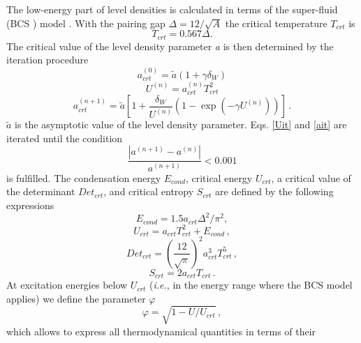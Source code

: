 The low-energy part of level densities is calculated in terms of the
super-fluid (BCS%
) model \cite{igna}. With the pairing gap $\Delta=12/%
\sqrt{A}$ the critical temperature $T_{crt}$ is 
\begin{equation}
T_{crt}=0.567\Delta.  \label{Tcrt}
\end{equation}
The critical value of the level density parameter \emph{a} is then
determined by the iteration procedure 
\begin{equation}
a_{crt}^{(0)}=\widetilde{a}\left(1+\gamma\delta_{W}\right)  \label{ait0}
\end{equation}
\begin{equation}
U^{(n)}=a_{crt}^{(n)}T_{crt}^{2}  \label{Uit}
\end{equation}
\begin{equation}
a_{crt}^{(n+1)}=\widetilde{a}\left[1+\frac{\delta_{W}}{U^{(n)}}%
\left(1-\exp\left(-\gamma U^{(n)}\right)\right)\right]\,.  \label{ait}
\end{equation}
$\widetilde{a}$ is the asymptotic value of the level density parameter. Eqs. %
\ref{Uit} and \ref{ait} are iterated until the condition 
\begin{equation}
\frac{\left|a^{(n+1)}-a^{(n)}\right|}{a^{(n+1)}}<0.001  \label{itercond}
\end{equation}
is fulfilled. The condensation energy $E_{cond}$, critical energy $U_{crt}$,
a critical value of the determinant $Det_{crt}$, and critical entropy $%
S_{crt}$ are defined by the following expressions 
\begin{equation}
E_{cond}=1.5a_{crt}\Delta^{2}/\pi^{2},  \label{Econd}
\end{equation}
\begin{equation}
U_{crt}=a_{crt}T_{crt}^{2}+E_{cond}\,,  \label{Ucrt}
\end{equation}
\begin{equation}
Det_{crt}=\left(\frac{12}{\sqrt{\pi}}\right)^{2}a_{crt}^{3}T_{crt}^{5}\,,
\label{Detcrt}
\end{equation}
\begin{equation}
S_{crt}=2a_{crt}T_{crt}\,.  \label{Scrt}
\end{equation}
At excitation energies below $U_{crt}$ (\textit{i.e.}, in the energy range
\noindent where the BCS%
 model applies) we define the parameter $\varphi$ 
\begin{equation}
\varphi=%
\sqrt{1-U/U_{crt}}\,,  \label{fiign}
\end{equation}
which allows to express all thermodynamical quantities in terms of their

